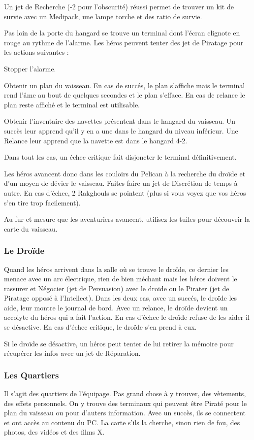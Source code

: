 Un jet de Recherche (-2 pour l'obscurité) réussi permet de trouver un kit de survie avec un Medipack, une lampe torche et des ratio de survie.

Pas loin de la porte du hangard se trouve un terminal dont l'écran clignote en rouge au rythme de l'alarme. Les héros peuvent tenter des jet de Piratage pour les actions suivantes :
\begin{rebelist}
	\item Stopper l'alarme. 
	\item Obtenir un plan du vaisseau. En cas de succés, le plan s'affiche mais le terminal rend l'âme au bout de quelques secondes et le plan s'efface. En cas de relance le plan reste affiché et le terminal est utilisable.
	\item  Obtenir l'inventaire des navettes présentent dans le hangard du vaisseau. Un succès leur apprend qu'il y en a une dans le hangard du niveau inférieur. Une Relance leur apprend que la navette est dans le hangard 4-2.
\end{rebelist}
Dans tout les cas, un échec critique fait disjoncter le terminal définitivement.

Les héros avancent donc dans les couloirs du Pelican à la recherche du droïde et d'un moyen de dévier le vaisseau. Faites faire un jet de Discrétion de temps à autre. En cas d'échec, 2 Rakghouls se pointent (plus si vous voyez que vos héros s'en tire trop facilement).

Au fur et mesure que les aventuriers avancent, utilisez les tuiles pour découvrir la carte du vaisseau.

\subsubsection{Le Droïde}
Quand les héros arrivent dans la salle où se trouve le droïde, ce dernier les menace avec un arc électrique, rien de bien méchant mais les héros doivent le rassurer et Négocier (jet de Persuasion) avec le droïde ou le Pirater (jet de Piratage opposé à l'Intellect). Dans les deux cas, avec un succés, le droïde les aide, leur montre le journal de bord. Avec un relance, le droïde devient un accolyte du héros qui a fait l'action. En cas d'échec le droïde refuse de les aider il se désactive. En cas d'échec critique, le droïde s'en prend à eux.

Si le droïde se désactive, un héros peut tenter de lui retirer la mémoire pour récupérer les infos avec un jet de Réparation. 

\subsubsection{Les Quartiers}
Il s'agit des quartiers de l'équipage. Pas grand chose à y trouver, des vètements, des effets personnels. On y trouve des terminaux qui peuvent être Piraté pour le plan du vaisseau ou pour d'auters information. Avec un succès, ils se connectent et ont accès au contenu du PC. La carte s'ils la cherche, sinon rien de fou, des photos, des vidéos et des films X.


